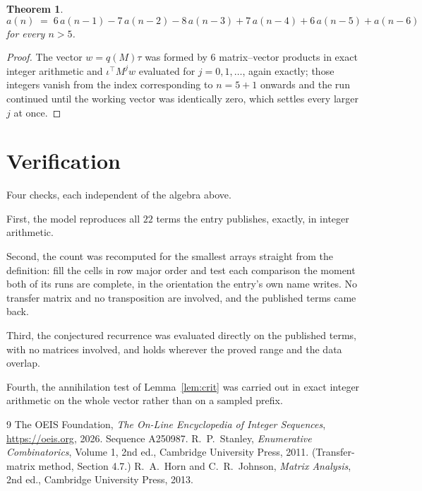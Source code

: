 \documentclass[11pt,a4paper]{article}
\theoremstyle{plain}
\newtheorem{theorem}{Theorem}
\theoremstyle{definition}
\begin{document}
\begin{theorem}
\[
a(n)\;=\;6\,a(n-1) - 7\,a(n-2) - 8\,a(n-3) + 7\,a(n-4) + 6\,a(n-5) + a(n-6)
\]
for every $n>5$.
\end{theorem}

\begin{proof}
The vector $w=q(M)\tau$ was formed by $6$ matrix--vector products in exact integer
arithmetic and $\iota^{\!\top}M^{j}w$ evaluated for $j=0,1,\dots$, again exactly; those
integers vanish from the index corresponding to $n=5+1$ onwards and the run continued
until the working vector was identically zero, which settles every larger $j$ at once.
\end{proof}

\section{Verification}

Four checks, each independent of the algebra above.

First, the model reproduces all $22$ terms the entry publishes, exactly, in integer
arithmetic.

Second, the count was recomputed for the smallest arrays straight from the definition: fill the
cells in row major order and test each comparison the moment both of its runs are complete,
in the orientation the entry's own name writes. No transfer matrix and no transposition are
involved, and the published terms came back.

Third, the conjectured recurrence was evaluated directly on the published terms, with no
matrices involved, and holds wherever the proved range and the data overlap.

Fourth, the annihilation test of Lemma~\ref{lem:crit} was carried out in exact integer
arithmetic on the whole vector rather than on a sampled prefix.

\begin{thebibliography}{9}
 The OEIS Foundation, \emph{The On-Line Encyclopedia of Integer
Sequences}, \url{https://oeis.org}, 2026. Sequence A250987.
 R.~P.~Stanley, \emph{Enumerative Combinatorics}, Volume 1, 2nd ed.,
Cambridge University Press, 2011. (Transfer-matrix method, Section 4.7.)
 R.~A.~Horn and C.~R.~Johnson, \emph{Matrix Analysis}, 2nd ed., Cambridge
University Press, 2013.
\end{thebibliography}
\end{document}
